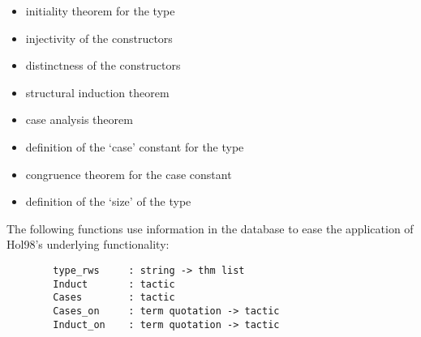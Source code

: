 \documentclass[12pt,fleqn,a4paper]{report}
\begin{document}
\begin{itemize}
\item initiality theorem for the type
\item injectivity of the constructors
\item distinctness of the constructors
\item structural induction theorem
\item case analysis theorem
\item definition of the `case' constant for the type
\item congruence theorem for the case constant
\item definition of the `size' of the type
\end{itemize}

The following functions use information in the database to ease the
application of Hol98's underlying functionality:
\begin{verbatim}
        type_rws     : string -> thm list
        Induct       : tactic
        Cases        : tactic
        Cases_on     : term quotation -> tactic
        Induct_on    : term quotation -> tactic
\end{verbatim}
\end{document}
